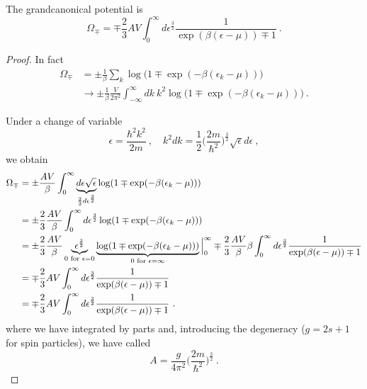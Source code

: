     The grandcanonical potential is 
    \begin{equation*}
        \Omega_\mp = \mp \frac{2}{3}AV \int_0^\infty d \epsilon^{\frac{3}{2}} \frac{1}{\exp(\beta(\epsilon - \mu)) \mp 1}  ~.
    \end{equation*}
    \begin{proof}
        In fact 
        \begin{equation*}
        \begin{aligned}
            \Omega_\mp & = \pm \frac{1}{\beta} \sum_k \log \Big (1 \mp \exp (-\beta (\epsilon_k - \mu)) \Big) \\ & \rightarrow \pm \frac{1}{\beta} \frac{V}{2\pi^2} \int_{-\infty}^\infty dk ~ k^2 \log \Big (1 \mp \exp (-\beta (\epsilon_k - \mu)) \Big) ~.
        \end{aligned}
        \end{equation*}

        Under a change of variable 
        \begin{equation*}
            \epsilon = \frac{\hbar^2 k^2}{2m} ~, \quad k^2 dk = \frac{1}{2} \Big (\frac{2m}{\hbar^2}\Big)^{\frac{3}{2}} \sqrt{\epsilon} d\epsilon ~,
        \end{equation*}
        we obtain 
        \begin{equation*}
        \begin{aligned}
            \Omega_\mp & = \pm \frac{AV}{\beta} \int_0^\infty \underbrace{d\epsilon \sqrt{\epsilon}}_{\frac{2}{3} d \epsilon^{\frac{3}{2}}} \log  (1 \mp \exp (-\beta (\epsilon_k - \mu)) ) \\ & = \pm \frac{2}{3} \frac{AV}{\beta} \int_0^\infty d \epsilon^{\frac{3}{2}} \log  (1 \mp \exp (-\beta (\epsilon_k - \mu)) ) \\ & = \pm \frac{2}{3} \frac{AV}{\beta} \underbrace{\epsilon^{\frac{3}{2}}}_{0 \textnormal{ for } \epsilon = 0} \underbrace{\log  (1 \mp \exp (-\beta (\epsilon_k - \mu)))}_{0 \textnormal{ for } \epsilon = \infty} \Big \vert_0^\infty \mp \frac{2}{3} \frac{AV}{\beta} \beta \int_0^\infty d \epsilon^{\frac{3}{2}} \frac{1}{\exp(\beta(\epsilon - \mu)) \mp 1} \\ & = \mp \frac{2}{3}AV \int_0^\infty d \epsilon^{\frac{3}{2}} \frac{1}{\exp(\beta(\epsilon - \mu)) \mp 1} \\ & = \mp \frac{2}{3} AV \int_0^\infty d \epsilon^{\frac{3}{2}} \frac{1}{\exp(\beta(\epsilon - \mu)) \mp 1} ~.
        \end{aligned}
        \end{equation*}
        where we have integrated by parts and, introducing the degeneracy ($g = 2s+1$ for spin particles), we have called 
        \begin{equation*}
            A = \frac{g}{4\pi^2} \Big (\frac{2m}{\hbar^2}\Big)^{\frac{3}{2}} ~. 
        \end{equation*}
    \end{proof}

